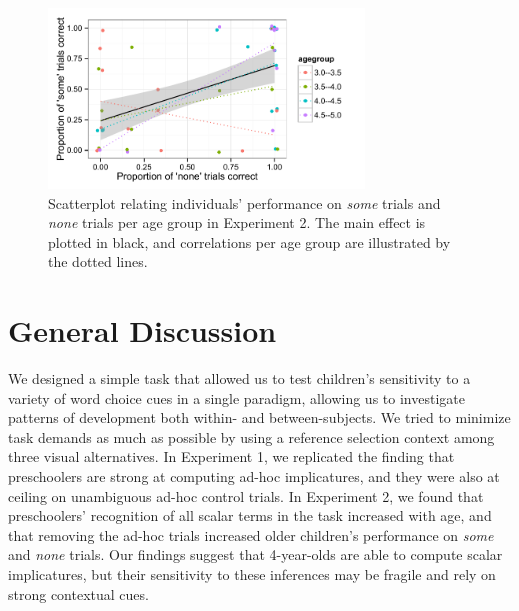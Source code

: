 \documentclass[10pt,letterpaper]{article}
\begin{document}
\begin{figure}[h] 
  \begin{center} 
    \includegraphics[width=3.3in]{figures/implicatures_scalarOnly_scatterplot.pdf} 
    \caption{\label{fig:expt2scatterplot} Scatterplot relating individuals' performance on \emph{some} trials and \emph{none} trials per age group in Experiment 2. The main effect is plotted in black, and correlations per age group are illustrated by the dotted lines.  }
    \end{center} 
\end{figure}


 \section{General Discussion} 
 
We designed a simple task that allowed us to test children's sensitivity to a variety of word choice cues in a single paradigm, allowing us to investigate patterns of development both within- and between-subjects. We tried to minimize task demands as much as possible by using a reference selection context among three visual alternatives. In Experiment 1, we replicated the finding that preschoolers are strong at computing ad-hoc implicatures, and they were also at ceiling on unambiguous ad-hoc control trials. In Experiment 2, we found that preschoolers' recognition of all scalar terms in the task increased with age, and that removing the ad-hoc trials increased older children's performance on \emph{some} and \emph{none} trials. Our findings suggest that 4-year-olds are able to compute scalar implicatures, but their sensitivity to these inferences may be fragile and rely on strong contextual cues. 
\end{document}
